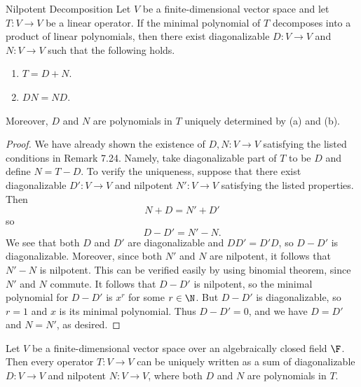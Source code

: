 \documentclass[linearalgebra]{subfiles}
\begin{document}
    \begin{theorem}{Nilpotent Decomposition}
        Let $V$ be a finite-dimensional vector space and let $T:V\to V$ be a linear operator. If the minimal polynomial of $T$ decomposes into a product of linear polynomials, then there exist diagonalizable $D:V\to V$ and $N:V\to V$ such that the following holds.
        \begin{enumerate}
            \item $T = D+N$.
            \item $DN = ND$.
        \end{enumerate}
        Moreover, $D$ and $N$ are polynomials in $T$ uniquely determined by (a) and (b).
    \end{theorem}

    \begin{proof}
        We have already shown the existence of $D, N:V\to V$ satisfying the listed conditions in Remark 7.24. Namely, take diagonalizable part of $T$ to be $D$ and define $N = T-D$. To verify the uniqueness, suppose that there exist diagonalizable $D':V\to V$ and nilpotent $N':V\to V$ satisfying the listed properties. Then
        \begin{equation*}
            N + D = N' + D'
        \end{equation*}
        so
        \begin{equation*}
            D - D' = N' - N.
        \end{equation*}
        We see that both $D$ and $D'$ are diagonalizable and $DD' = D'D$, so $D-D'$ is diagonalizable. Moreover, since both $N'$ and $N$ are nilpotent, it follows that $N'-N$ is nilpotent. This can be verified easily by using binomial theorem, since $N'$ and $N$ commute. It follows that $D-D'$ is nilpotent, so the minimal polynomial for $D-D'$ is $x^r$ for some $r\in \N$. But $D-D'$ is diagonalizable, so $r=1$ and $x$ is its minimal polynomial. Thus $D-D'=0$, and we have $D=D'$ and
        $N=N'$, as desired. 
    \end{proof}

    \begin{cor}{}
        Let $V$ be a finite-dimensional vector space over an algebraically closed field $\F$. Then every operator $T:V\to V$ can be uniquely written as a sum of diagonalizable $D:V\to V$ and nilpotent $N:V\to V$, where both $D$ and $N$ are polynomials in $T$.
    \end{cor}	
\end{document}
